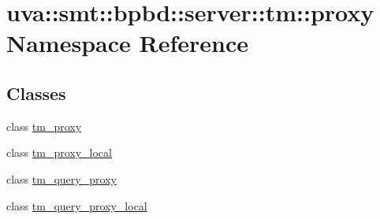 \hypertarget{namespaceuva_1_1smt_1_1bpbd_1_1server_1_1tm_1_1proxy}{}\section{uva\+:\+:smt\+:\+:bpbd\+:\+:server\+:\+:tm\+:\+:proxy Namespace Reference}
\label{namespaceuva_1_1smt_1_1bpbd_1_1server_1_1tm_1_1proxy}
\subsection*{Classes}
\begin{DoxyCompactItemize}
\item 
class \hyperlink{classuva_1_1smt_1_1bpbd_1_1server_1_1tm_1_1proxy_1_1tm__proxy}{tm\+\_\+proxy}
\item 
class \hyperlink{classuva_1_1smt_1_1bpbd_1_1server_1_1tm_1_1proxy_1_1tm__proxy__local}{tm\+\_\+proxy\+\_\+local}
\item 
class \hyperlink{classuva_1_1smt_1_1bpbd_1_1server_1_1tm_1_1proxy_1_1tm__query__proxy}{tm\+\_\+query\+\_\+proxy}
\item 
class \hyperlink{classuva_1_1smt_1_1bpbd_1_1server_1_1tm_1_1proxy_1_1tm__query__proxy__local}{tm\+\_\+query\+\_\+proxy\+\_\+local}
\end{DoxyCompactItemize}
